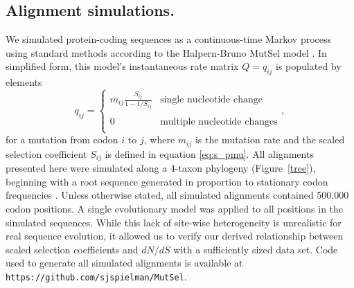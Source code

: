 \documentclass[11pt]{article}
\begin{document}
\subsection*{Alignment simulations.}
We simulated protein-coding sequences as a continuous-time Markov process using standard methods \cite{Yang2006} according to the Halpern-Bruno MutSel model \cite{HalpernBruno1998}. In simplified form, this model's instantaneous rate matrix $Q = q_{ij}$ is populated by elements
\begin{equation}\label{eq:HBmatrix}
q_{ij} = \left\{ 
\begin{array}{rl}
m_{ij} \frac{S_{ij}}{1-1/S_{ij}} &\mbox{single nucleotide change} \\\\
0                                  &\mbox{multiple nucleotide changes} \\             
\end{array} \right.,
\end{equation} for a mutation from codon $i$ to $j$, where $m_{ij}$ is the mutation rate and the scaled selection coefficient $S_{ij}$ is defined in equation \eqref{eq:s_pmu}. All alignments presented here were simulated along a 4-taxon phylogeny (Figure~\ref{tree}), beginning with a root sequence generated in proportion to  stationary codon frequencies \cite{Yang2006}. Unless otherwise stated, all simulated alignments contained 500,000 codon positions. A single evolutionary model was applied to all positions in the simulated sequences. While this lack of site-wise heterogeneity is unrealistic for real sequence evolution, it allowed us to verify our derived relationship between scaled selection coefficients and $dN/dS$ with a sufficiently sized data set. Code used to generate all simulated alignments is available at \texttt{https://github.com/sjspielman/MutSel}.
	
\end{document}
